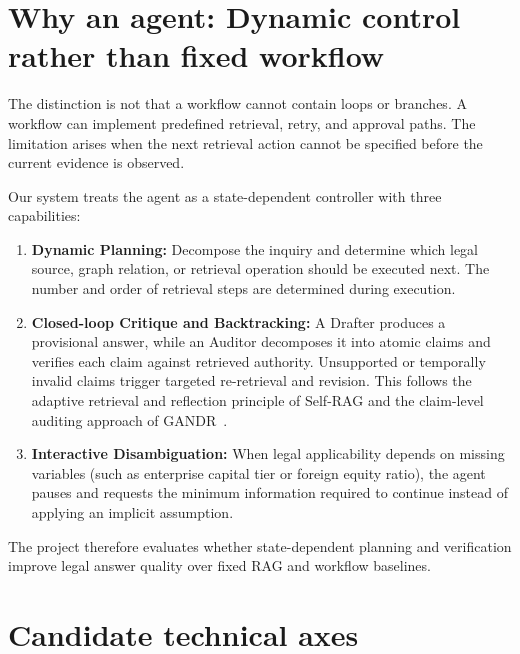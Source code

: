 \section{Why an agent: Dynamic control rather than fixed workflow}

The distinction is not that a workflow cannot contain loops or branches. A workflow can implement predefined retrieval, retry, and approval paths. The limitation arises when the next retrieval action cannot be specified before the current evidence is observed.

Our system treats the agent as a state-dependent controller with three capabilities:

\begin{enumerate}
    \item \textbf{Dynamic Planning:} Decompose the inquiry and determine which legal source, graph relation, or retrieval operation should be executed next. The number and order of retrieval steps are determined during execution.

    \item \textbf{Closed-loop Critique and Backtracking:} A Drafter produces a provisional answer, while an Auditor decomposes it into atomic claims and verifies each claim against retrieved authority. Unsupported or temporally invalid claims trigger targeted re-retrieval and revision. This follows the adaptive retrieval and reflection principle of Self-RAG and the claim-level auditing approach of GANDR~\cite{asai2024selfrag,qian2026gandr}.

    \item \textbf{Interactive Disambiguation:} When legal applicability depends on missing variables (such as enterprise capital tier or foreign equity ratio), the agent pauses and requests the minimum information required to continue instead of applying an implicit assumption.
\end{enumerate}

The project therefore evaluates whether state-dependent planning and verification improve legal answer quality over fixed RAG and workflow baselines.

\section{Candidate technical axes}

